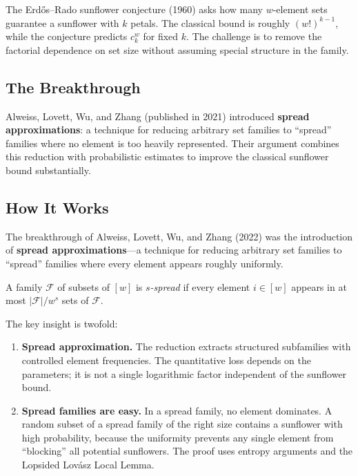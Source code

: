 The Erd\H{o}s--Rado sunflower conjecture (1960) asks how many $w$-element sets guarantee a sunflower with $k$ petals. The classical bound is roughly $(w!)^{k-1}$, while the conjecture predicts $c_k^w$ for fixed $k$. The challenge is to remove the factorial dependence on set size without assuming special structure in the family.

\subsection{The Breakthrough}

Alweiss, Lovett, Wu, and Zhang (published in 2021) introduced \textbf{spread approximations}: a technique for reducing arbitrary set families to ``spread'' families where no element is too heavily represented. Their argument combines this reduction with probabilistic estimates to improve the classical sunflower bound substantially.

\subsection{How It Works}

The breakthrough of Alweiss, Lovett, Wu, and Zhang (2022) \cite{alweiss2022} was the introduction of \textbf{spread approximations}---a technique for reducing arbitrary set families to ``spread'' families where every element appears roughly uniformly.

\begin{definition}
A family $\mathcal{F}$ of subsets of $[w]$ is \emph{$s$-spread} if every element $i \in [w]$ appears in at most $|\mathcal{F}| / w^s$ sets of $\mathcal{F}$.
\end{definition}

The key insight is twofold:

\begin{enumerate}
\item \textbf{Spread approximation.} The reduction extracts structured subfamilies with controlled element frequencies. The quantitative loss depends on the parameters; it is not a single logarithmic factor independent of the sunflower bound.
\item \textbf{Spread families are easy.} In a spread family, no element dominates. A random subset of a spread family of the right size contains a sunflower with high probability, because the uniformity prevents any single element from ``blocking'' all potential sunflowers. The proof uses entropy arguments and the Lopsided Lov\'{a}sz Local Lemma.
\end{enumerate}

